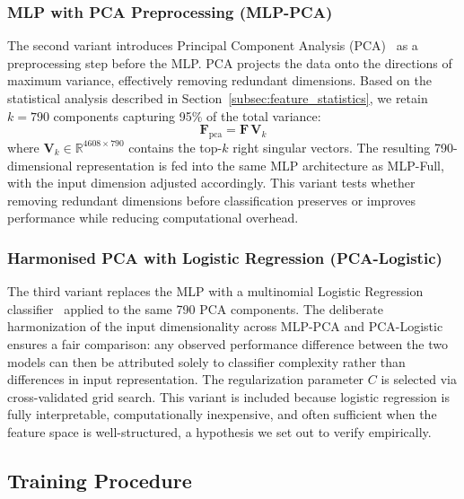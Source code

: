 \documentclass[pdflatex,sn-basic]{sn-jnl}
\begin{document}
\subsubsection{MLP with PCA Preprocessing (MLP-PCA)}
\label{subsubsec:mlp_pca}

The second variant introduces Principal Component Analysis (PCA)~\cite{jolliffe2002principal} as a preprocessing step before the MLP. PCA projects the data onto the directions of maximum variance, effectively removing redundant dimensions. Based on the statistical analysis described in Section~\ref{subsec:feature_statistics}, we retain $k = 790$ components capturing 95\% of the total variance:
\begin{equation}
    \mathbf{F}_{\text{pca}} = \mathbf{F}\,\mathbf{V}_k
    \label{eq:pca}
\end{equation}
where $\mathbf{V}_k \in \mathbb{R}^{4608 \times 790}$ contains the top-$k$ right singular vectors. The resulting 790-dimensional representation is fed into the same MLP architecture as MLP-Full, with the input dimension adjusted accordingly. This variant tests whether removing redundant dimensions before classification preserves or improves performance while reducing computational overhead.

\subsubsection{Harmonised PCA with Logistic Regression (PCA-Logistic)}
\label{subsubsec:pca_logistic}

The third variant replaces the MLP with a multinomial Logistic Regression classifier~\cite{bishop2006pattern} applied to the same 790 PCA components. The deliberate harmonization of the input dimensionality across MLP-PCA and PCA-Logistic ensures a fair comparison: any observed performance difference between the two models can then be attributed solely to classifier complexity rather than differences in input representation. The regularization parameter $C$ is selected via cross-validated grid search. This variant is included because logistic regression is fully interpretable, computationally inexpensive, and often sufficient when the feature space is well-structured, a hypothesis we set out to verify empirically.

\subsection{Training Procedure}
\label{subsec:training}
\end{document}

